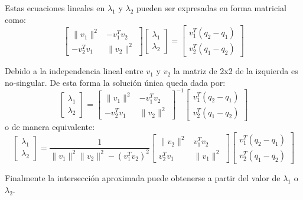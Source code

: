 Estas ecuaciones lineales en $\lambda_1$ y $\lambda_2$ pueden ser expresadas en forma matricial como:
\[ 
    \begin{bmatrix}
        \|v_1\|^2  & -v_1^T v_2 \\
        -v_2^T v_1 & \|v_2\|^2
    \end{bmatrix}
    \begin{bmatrix} 
        \lambda_1 \\ 
        \lambda_2
    \end{bmatrix}
    = 
    \begin{bmatrix}
        v_1^T (q_2 - q_1) \\
        v_2^T (q_1 - q_2)
    \end{bmatrix} 
\]

Debido a la independencia lineal entre $v_1$ y $v_2$ la matriz de 2x2 de la izquierda es no-singular. De esta forma la solución única queda dada por:
\[ 
    \begin{bmatrix} 
        \lambda_1 \\ 
        \lambda_2
    \end{bmatrix}
    =
    \begin{bmatrix}
        \|v_1\|^2  & -v_1^T v_2 \\
        -v_2^T v_1 & \|v_2\|^2
    \end{bmatrix}
    ^{-1}
    \begin{bmatrix}
        v_1^T (q_2 - q_1) \\
        v_2^T (q_1 - q_2)
    \end{bmatrix}
\]
o de manera equivalente:
\[ 
    \begin{bmatrix} 
        \lambda_1 \\ 
        \lambda_2
    \end{bmatrix}
    =
    \frac{1}{ \|v_1\|^2 \|v_2\|^2 -(v_1^T v_2)^2 }
    \begin{bmatrix}
        \|v_2\|^2  & v_1^T v_2 \\
        v_2^T v_1  & \|v_1\|^2
    \end{bmatrix}
    \begin{bmatrix}
        v_1^T (q_2 - q_1) \\
        v_2^T (q_1 - q_2)
    \end{bmatrix}
\]

Finalmente la intersección aproximada puede obtenerse a partir del valor de $\lambda_1$ o $\lambda_2$.

